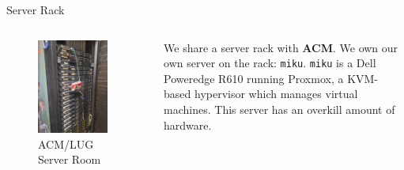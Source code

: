 \documentclass{beamer}
\begin{document}
\begin{frame}{Server Rack}
	\begin{columns}
		\begin{column}{0.4\textwidth}
			\begin{figure}
				\centering
				\includegraphics[width=0.9\textwidth]{server.jpg}
				\caption{ACM/LUG Server Room}
			\end{figure}
		\end{column}
		\begin{column}{0.6\textwidth}
			We share a server rack with \textbf{ACM}. \pause We own
			our own server on the rack: \texttt{miku}.
			\texttt{miku} is a Dell Poweredge R610 running Proxmox,
			a KVM-based hypervisor which manages virtual machines.
			This server has an overkill amount of hardware.
		\end{column}
	\end{columns}
\end{frame}
\end{document}
